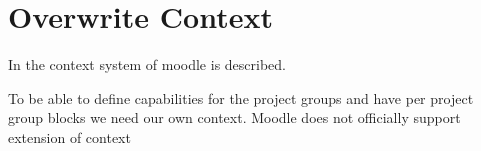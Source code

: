 
\section{Overwrite Context}
In  the context system of moodle is described. 

To be able to define capabilities for the project groups and have per project group blocks we need our own context. 
Moodle does not officially support extension of context